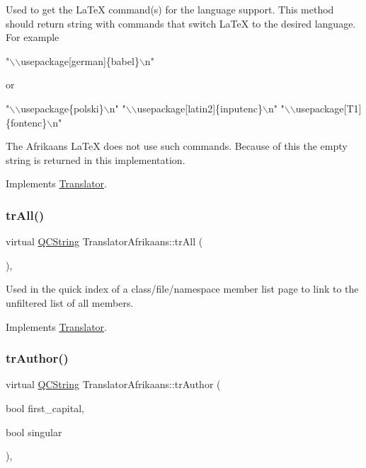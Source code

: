 Used to get the La\+TeX command(s) for the language support. This method should return string with commands that switch La\+TeX to the desired language. For example 
\begin{DoxyPre}"\(\backslash\)\(\backslash\)usepackage[german]\{babel\}\(\backslash\)n"
 \end{DoxyPre}
 or 
\begin{DoxyPre}"\(\backslash\)\(\backslash\)usepackage\{polski\}\(\backslash\)n"
 "\(\backslash\)\(\backslash\)usepackage[latin2]\{inputenc\}\(\backslash\)n"
 "\(\backslash\)\(\backslash\)usepackage[T1]\{fontenc\}\(\backslash\)n"
 \end{DoxyPre}


The Afrikaans La\+TeX does not use such commands. Because of this the empty string is returned in this implementation. 

Implements \mbox{\hyperlink{class_translator}{Translator}}.

\mbox{\label{class_translator_afrikaans_a7495a5cb98f92d7275e34facb69a9479}} 
\subsubsection{\texorpdfstring{trAll()}{trAll()}}
{\footnotesize\ttfamily virtual \mbox{\hyperlink{class_q_c_string}{Q\+C\+String}} Translator\+Afrikaans\+::tr\+All (\begin{DoxyParamCaption}{ }\end{DoxyParamCaption})\hspace{0.3cm}{\ttfamily [inline]}, {\ttfamily [virtual]}}

Used in the quick index of a class/file/namespace member list page to link to the unfiltered list of all members. 

Implements \mbox{\hyperlink{class_translator}{Translator}}.

\mbox{\label{class_translator_afrikaans_a49878084dc244d99903a0283a8e79941}} 
\subsubsection{\texorpdfstring{trAuthor()}{trAuthor()}}
{\footnotesize\ttfamily virtual \mbox{\hyperlink{class_q_c_string}{Q\+C\+String}} Translator\+Afrikaans\+::tr\+Author (\begin{DoxyParamCaption}\item[{bool}]{first\+\_\+capital,  }\item[{bool}]{singular }\end{DoxyParamCaption})\hspace{0.3cm}{\ttfamily [inline]}, {\ttfamily [virtual]}}

